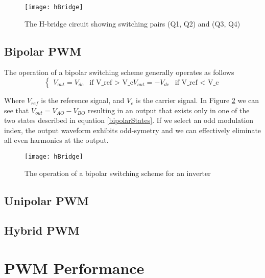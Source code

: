 \begin{figure}
\centering
\texttt{[image: hBridge]}
\caption{The H-bridge circuit showing switching pairs (Q1, Q2) and (Q3, Q4)}
\label{hBridge}
\end{figure}


\subsection{Bipolar PWM}
The operation of a bipolar switching scheme generally operates as follows
\begin{equation}
\begin{cases}
\label{bipolarStates}
V_{out} = V_{dc} &\mbox{if V_{ref} > V_{c}}
V_{out} = -V_{dc} &\mbox{if V_{ref} < V_{c}}
\end{cases}
\end{equation}

Where $V_{ref}$ is the reference signal, and $V_c$ is the carrier signal. In Figure \ref{bipolarSwitchingOperation} we can see that $V_{out} = V_{AO}-V_{BO}$ resulting in an output that exists only in one of the two states described in equation \ref{bipolarStates}. If we select an odd modulation index, the output waveform exhibits odd-symetry and we can effectively eliminate all even harmonics at the output.

\begin{figure}
\centering
\texttt{[image: hBridge]}
\caption{The operation of a bipolar switching scheme for an inverter \cite{fourierAnalysis}}
\label{bipolarSwitchingOperation}
\end{figure}

\subsection{Unipolar PWM}


\subsection{Hybrid PWM}

\section{PWM Performance}

